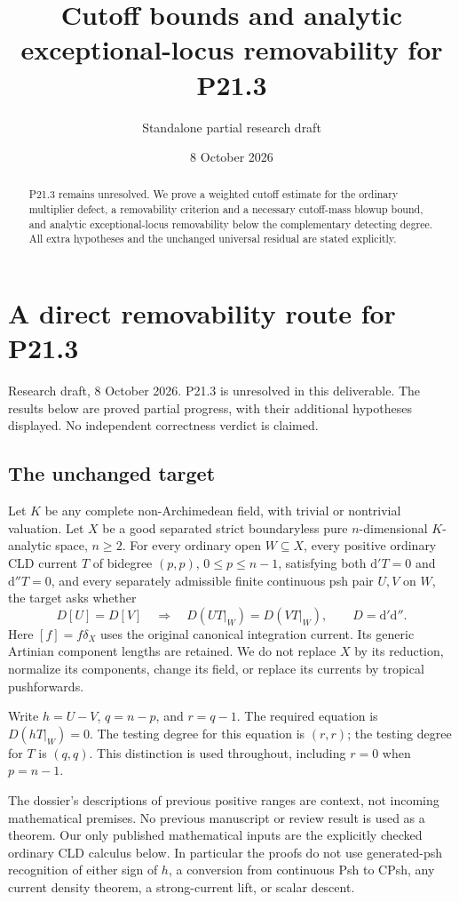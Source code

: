 \documentclass[11pt]{article}
\title{Cutoff bounds and analytic exceptional-locus removability for P21.3}
\author{Standalone partial research draft}
\date{8 October 2026}
\begin{document}
\maketitle
\begin{abstract}
P21.3 remains unresolved. We prove a weighted cutoff estimate for the
ordinary multiplier defect, a removability criterion and a necessary
cutoff-mass blowup bound, and analytic exceptional-locus removability
below the complementary detecting degree. All extra hypotheses and
the unchanged universal residual are stated explicitly.
\end{abstract}
\section{A direct removability route for P21.3}

Research draft, 8 October 2026. P21.3 is unresolved in this deliverable. The results below are proved partial progress, with their additional hypotheses displayed. No independent correctness verdict is claimed.

\subsection{The unchanged target}

Let \(K\) be any complete non-Archimedean field, with trivial or nontrivial valuation. Let \(X\) be a good separated strict boundaryless pure \(n\)-dimensional \(K\)-analytic space, \(n\geq2\). For every ordinary open \(W\subseteq X\), every positive ordinary CLD current \(T\) of bidegree \((p,p)\), \(0\leq p\leq n-1\), satisfying both \(\mathrm d'T=0\) and \(\mathrm d''T=0\), and every separately admissible finite continuous psh pair \(U,V\) on \(W\), the target asks whether
\[
 D[U]=D[V]\quad\Longrightarrow\quad D(UT|_W)=D(VT|_W),\qquad D=\mathrm d'\mathrm d''.
\]
Here \([f]=f\delta_X\) uses the original canonical integration current. Its generic Artinian component lengths are retained. We do not replace \(X\) by its reduction, normalize its components, change its field, or replace its currents by tropical pushforwards.

Write \(h=U-V\), \(q=n-p\), and \(r=q-1\). The required equation is \(D(hT|_W)=0\). The testing degree for this equation is \((r,r)\); the testing degree for \(T\) is \((q,q)\). This distinction is used throughout, including \(r=0\) when \(p=n-1\).

The dossier's descriptions of previous positive ranges are context, not incoming mathematical premises. No previous manuscript or review result is used as a theorem. Our only published mathematical inputs are the explicitly checked ordinary CLD calculus below. In particular the proofs do not use generated-psh recognition of either sign of \(h\), a conversion from continuous Psh to CPsh, any current density theorem, a strong-current lift, or scalar descent.
\end{document}
